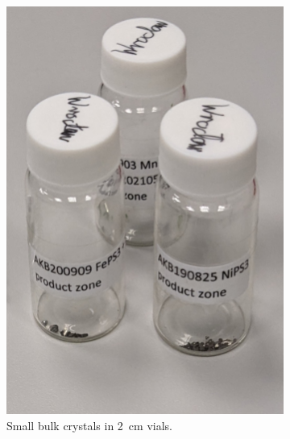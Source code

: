 \documentclass[
	twoside,
	parskip=half,
	a4paper,
]{scrbook}
\begin{document}
\begin{figure}
	\centering
	\begin{subfigure}[t]{.24\textwidth}
		\vskip 0pt
		\includegraphics[width=\textwidth]{../../photos/bulk_sample.jpg}
		\caption{Small bulk crystals in \SI{2}{cm} vials.}
		\label{fig:samples_vials}
	\end{subfigure}
	\begin{subfigure}[t]{.24\textwidth}
		\vskip 0pt

\end{subfigure}
\end{figure}
\end{document}
